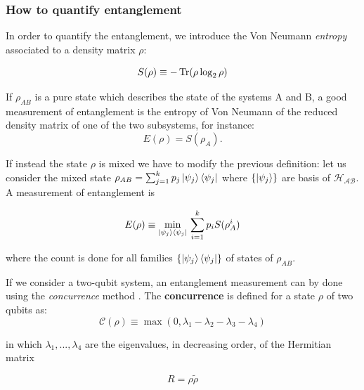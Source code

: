 \subsubsection{How to quantify entanglement}

In order to quantify the entanglement, we introduce the Von Neumann \textit{entropy} associated to a density matrix $\rho$:

\begin{equation}
S(\rho) \equiv - \operatorname{Tr}(\rho \log_2 \rho)
 \label{16_firstchapter}
\end{equation}

\noindent If $\rho_{AB}$ is a pure state which describes the state of the systems A and B, a good measurement of entanglement is the entropy of Von Neumann of the reduced density matrix of one of the two subsystems, for instance: 
\begin{equation}
E(\rho)= S(\rho_A) .
 \label{17_firstchapter}
\end{equation}

\noindent If instead the state $\rho$ is mixed we have to modify the previous definition: let us consider the mixed state $\rho_{AB} = \sum_{j=1}^k p_j \left| \psi_j \right \rangle\left\langle \psi_j \right |$ where $ \{\left| \psi_j \right \rangle\}$ are basis of $\mathcal{H_{\text{AB}}}$. 
 A measurement of entanglement is
 
 \begin{equation}
E(\rho) \equiv \min_{ \left| \psi_j \right \rangle\left\langle \psi_j \right | }\, \sum_{i=1}^k p_i S(\rho_A^i)  
\label{18_firstchapter}
\end{equation}

\noindent where the count is done for all families $\{ \left| \psi_j \right \rangle\left\langle \psi_j \right | \}$ of states of $\rho_{AB}$.

If we consider a two-qubit system, an entanglement measurement can by done using the \textit{concurrence} method \cite{Concurrence}. The \textbf{concurrence} is defined for a state $\rho$ of two qubits as:
 \begin{equation}
 {\mathcal  {C}}(\rho )\equiv \max(0,\lambda _{1}-\lambda _{2}-\lambda _{3}-\lambda _{4})
\label{18_2_firstchapter}
\end{equation}

\noindent in which $\lambda _{1},...,\lambda _{4}$ are the eigenvalues, in decreasing order, of the Hermitian matrix

\begin{equation}
R=  \rho \tilde  {\rho }
\label{18_3_firstchapter}
\end{equation}

